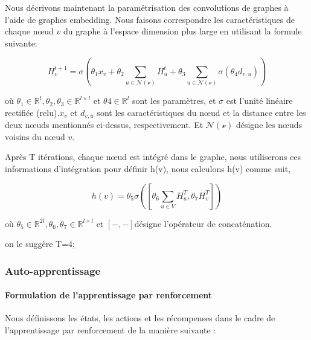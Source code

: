 \documentclass[]{article}
\let\oldparagraph\paragraph
\renewcommand{\paragraph}[1]{\oldparagraph{#1}\mbox{}}
\begin{document}
Nous décrivons maintenant la paramétrisation des convolutions de graphes
à l'aide de graphes embedding. Nous faisons correspondre les
caractéristiques de chaque nœud \(v\) du graphe à l'espace dimension
plus large en utilisant la formule suivante:

\[H_v^{t+1}= \sigma(\theta_1 x_v+\theta_2\sum_{u\in \mathcal{N(v)}}H_u^t+\theta_3\sum_{u\in\mathcal{N(v)}}\sigma(\theta_4d_{v,u}))\]

où \(\theta_1 ∈ \mathbb{R}^l , \theta_2,\theta_3 ∈ \mathbb{R}^ {l×l}\)
et \(θ 4 ∈ \mathbb{R}^ l\) sont les paramètres, et \(\sigma\) est
l'unité linéaire rectifiée (relu).\( x_v\) et \(d_ {v,u}\) sont les
caractéristiques du nœud et la distance entre les deux nœuds mentionnés
ci-dessus, respectivement. Et \(\mathcal{N (v)}\) désigne les nœuds
voisins du nœud \(v\).

Après T itérations, chaque nœud est intégré dans le graphe, nous
utiliserons ces informations d'intégration pour définir h(v), nous
calculons h(v) comme suit,

\[h(v)= \theta_5 \sigma([\theta_6\sum_{u\in V}H_u^T,\theta_7H_v^T])\]

où
\(\theta_5 ∈ \mathbb{R}^{2l} ,\theta_6,\theta_7 ∈ \mathbb{R}^ {l\times l}   \)
et \([-, -] \)désigne l'opérateur de concaténation.

on le suggère T=4;

\hypertarget{auto-apprentissage}{%
\subsubsection{Auto-apprentissage}\label{auto-apprentissage}}

\hypertarget{formulation-de-lapprentissage-par-renforcement}{%
\paragraph{Formulation de l'apprentissage par
renforcement}\label{formulation-de-lapprentissage-par-renforcement}}

Nous définissons les états, les actions et les récompenses dans le cadre
de l'apprentissage par renforcement de la manière suivante :
\end{document}
